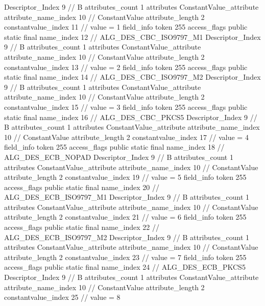 {{{{{				Descriptor_Index	9		// B
				attributes_count	1
				attributes {
				ConstantValue_attribute {
					attribute_name_index	10		// ConstantValue
					attribute_length	2
					constantvalue_index	11		// value = 1
				}
				}
			}
			field_info {
				token	255
				access_flags	public static final
				name_index	12		// ALG_DES_CBC_ISO9797_M1
				Descriptor_Index	9		// B
				attributes_count	1
				attributes {
				ConstantValue_attribute {
					attribute_name_index	10		// ConstantValue
					attribute_length	2
					constantvalue_index	13		// value = 2
				}
				}
			}
			field_info {
				token	255
				access_flags	public static final
				name_index	14		// ALG_DES_CBC_ISO9797_M2
				Descriptor_Index	9		// B
				attributes_count	1
				attributes {
				ConstantValue_attribute {
					attribute_name_index	10		// ConstantValue
					attribute_length	2
					constantvalue_index	15		// value = 3
				}
				}
			}
			field_info {
				token	255
				access_flags	public static final
				name_index	16		// ALG_DES_CBC_PKCS5
				Descriptor_Index	9		// B
				attributes_count	1
				attributes {
				ConstantValue_attribute {
					attribute_name_index	10		// ConstantValue
					attribute_length	2
					constantvalue_index	17		// value = 4
				}
				}
			}
			field_info {
				token	255
				access_flags	public static final
				name_index	18		// ALG_DES_ECB_NOPAD
				Descriptor_Index	9		// B
				attributes_count	1
				attributes {
				ConstantValue_attribute {
					attribute_name_index	10		// ConstantValue
					attribute_length	2
					constantvalue_index	19		// value = 5
				}
				}
			}
			field_info {
				token	255
				access_flags	public static final
				name_index	20		// ALG_DES_ECB_ISO9797_M1
				Descriptor_Index	9		// B
				attributes_count	1
				attributes {
				ConstantValue_attribute {
					attribute_name_index	10		// ConstantValue
					attribute_length	2
					constantvalue_index	21		// value = 6
				}
				}
			}
			field_info {
				token	255
				access_flags	public static final
				name_index	22		// ALG_DES_ECB_ISO9797_M2
				Descriptor_Index	9		// B
				attributes_count	1
				attributes {
				ConstantValue_attribute {
					attribute_name_index	10		// ConstantValue
					attribute_length	2
					constantvalue_index	23		// value = 7
				}
				}
			}
			field_info {
				token	255
				access_flags	public static final
				name_index	24		// ALG_DES_ECB_PKCS5
				Descriptor_Index	9		// B
				attributes_count	1
				attributes {
				ConstantValue_attribute {
					attribute_name_index	10		// ConstantValue
					attribute_length	2
					constantvalue_index	25		// value = 8
				}
				}
			}
}}}}
